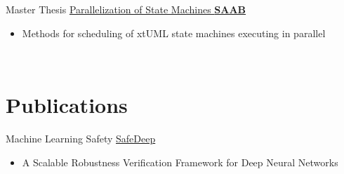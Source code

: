 \documentclass[letterpaper]{DS_class_file} %
\begin{document}
\begin{twenty}
 \twentyitem
	{Master}
	{Thesis}
	{\hspace{0.3cm}\href{}{Parallelization of State Machines }}
	{\href{https://www.saab.com/}{\textbf{SAAB}}}
	{}
	{
		{\begin{itemize}
				\item Methods for scheduling of xtUML state machines executing in parallel
		\end{itemize}}
	}
	\\
 \end{twenty}

 


\section{Publications}

\begin{twenty} %
    
	\twentyitem
	{Machine Learning}
	{Safety}
	{\hspace{0.3cm}\href{https://ieeexplore.ieee.org/document/10097028}{SafeDeep}}
	{}
	{}
	{
		{\begin{itemize}
				\item A Scalable Robustness Verification Framework for Deep Neural Networks
		\end{itemize}}
	}
	\\
	
	
	
\end{twenty}


\end{document}
